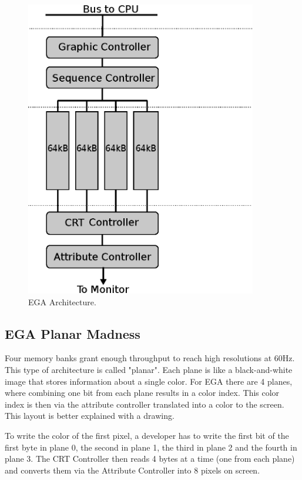 \documentclass[book.tex]{subfiles}
\begin{document}
\begin{figure}[H]
\centering
\includegraphics[width=0.9\textwidth]{imgs/drawings/ega.eps}
\caption{EGA Architecture.}
\label{fig:vga_arch}
\end{figure}

 


\subsection{EGA Planar Madness}
\label{section:EGA_Planar_Madness}

Four memory banks grant enough throughput to reach high resolutions at 60Hz. This type of architecture is called "planar". Each plane is like a black-and-white image that stores information about a single color. For EGA there are 4 planes, where combining one bit from each plane results in a color index. This color index is then via the attribute controller translated into a color to the screen. This layout is better explained with a drawing.\\

\par
To write the color of the first pixel, a developer has to write the first bit of the first byte in plane 0, the second in plane 1, the third in plane 2 and the fourth in plane 3. The CRT Controller then reads 4 bytes at a time (one from each plane) and converts them via the Attribute Controller into 8 pixels on screen. \\
\end{document}

